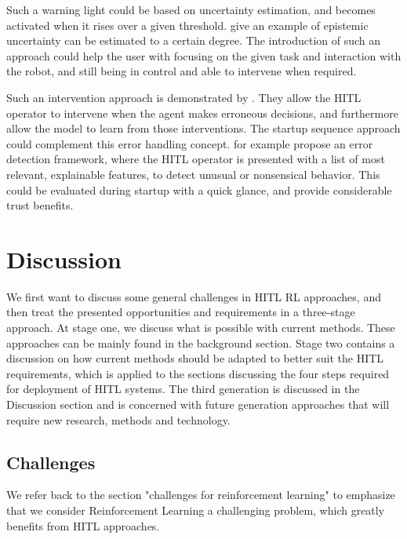\documentclass[twoside,11pt]{article}
\begin{document}
Such a warning light could be based on uncertainty estimation, and becomes activated when it rises over a given threshold. \citep{JainEtAl:2021:EpistemicUncertaintyPrediction} give an example of epistemic uncertainty can be estimated to a certain degree. The introduction of such an approach could help the user with focusing on the given task and interaction with the robot, and still being in control and able to intervene when required.

Such an intervention approach is demonstrated by \cite{WuEtAl:2021:HITLDRLAutonomousDriving}. They allow the HITL operator to intervene when the agent makes erroneous decisions, and furthermore allow the model to learn from those interventions. 
The startup sequence approach could complement this error handling concept. \cite{LiuGuoMahmud:2021:HITLErrorDetectionFramework} for example propose an error detection framework, where the HITL operator is presented with a list of most relevant, explainable features, to detect unusual or nonsensical behavior. This could be evaluated during startup with a quick glance, and provide considerable trust benefits.


\section{Discussion}

We first want to discuss some general challenges in HITL RL approaches, and then treat the presented opportunities and requirements in a three-stage approach. At stage one, we discuss what is possible with current methods. These approaches can be mainly found in the background section. Stage two contains a discussion on how current methods should be adapted to better suit the HITL requirements, which is applied to the sections discussing the four steps required for deployment of HITL systems. The third generation is discussed in the Discussion section and is concerned with future generation approaches that will require new research, methods and technology.

\subsection{Challenges}

We refer back to the section "challenges for reinforcement learning" to emphasize that we consider Reinforcement Learning a challenging problem, which greatly benefits from HITL approaches.
\end{document}
